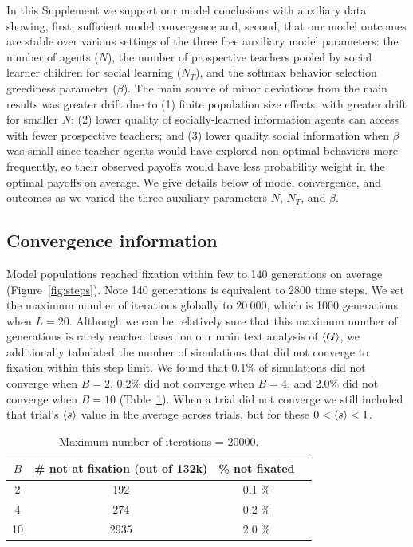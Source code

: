 \documentclass[letterpaper,11.5pt]{scrartcl}
\begin{document}
In this Supplement we support our model conclusions with auxiliary data
showing, first, sufficient model convergence and, second, that our model
outcomes are stable over various settings of the three free auxiliary model
parameters: the number of agents ($N$), the number of
prospective teachers pooled by social learner children for social learning
($N_T$), and the softmax behavior selection greediness parameter ($\beta$).
The main source of minor deviations from the main results was greater drift
due to (1) finite population size effects, with greater drift for smaller $N$;
(2) lower quality of socially-learned information agents can access with fewer
prospective teachers; and (3) lower quality social information when $\beta$
was small since teacher agents would have explored non-optimal behaviors more
frequently, so their observed payoffs would have less probability weight in
the optimal payoffs on average. We give details below of model convergence, and
outcomes as we varied the three auxiliary parameters $N$, $N_T$, and $\beta$.


\subsection{Convergence information}

Model populations reached fixation within few to 140 generations on
average (Figure~\ref{fig:steps}).
Note 140 generations is equivalent to 2800 time steps. We set the maximum 
number of iterations globally to $20~000$, which is 1000 generations when
$L=20$. Although we can be relatively sure that this maximum number of 
generations is rarely reached based on our main text analysis of $\langle G \rangle$,
we additionally tabulated the number of simulations that did not converge to
fixation
within this step limit. We found that 0.1\% of simulations did not converge
when $B=2$, 0.2\% did not converge when $B=4$, and 2.0\% did not converge
when $B=10$ (Table~\ref{tab:convergence}). When a trial did not converge we
still included that trial's $\langle s \rangle$ value in the average across trials,
but for these $0 < \langle s \rangle < 1$.

\begin{table}[h] \caption{Maximum number of iterations = 20000.} \label{tab:convergence} \centering
  \begin{tabular}{cccc} 
    \toprule $B$ & \# not at fixation (out of 132k) & \% not fixated \\ 
    \midrule  2  & 192  & 0.1 \% \\ 
              4  & 274  & 0.2 \% \\ 
              10 & 2935 & 2.0 \% \\ 
    \bottomrule \end{tabular} 
\end{table}
\end{document}

